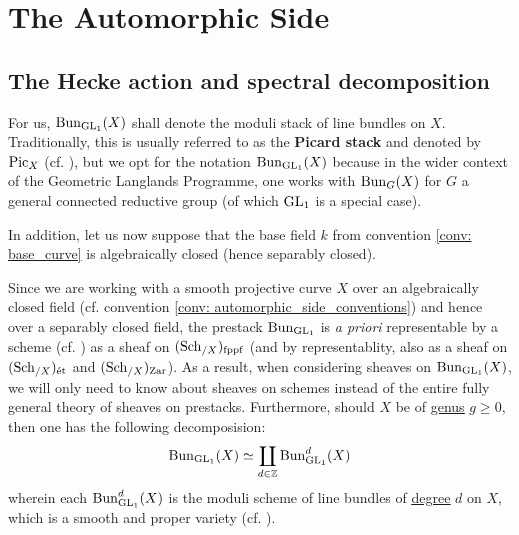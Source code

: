 \section{The Automorphic Side}
    \subsection{The Hecke action and spectral decomposition}
        \begin{convention} \label{conv: automorphic_side_conventions}
            For us, $\mathrm{Bun}_{\operatorname{GL}_1}(X)$ shall denote the moduli stack of line bundles on $X$. Traditionally, this is usually referred to as the \textbf{Picard stack} and denoted by $\mathrm{Pic}_X$ (cf. \cite[\href{https://stacks.math.columbia.edu/tag/0372}{Tag 0372}]{stacks}), but we opt for the notation $\mathrm{Bun}_{\operatorname{GL}_1}(X)$ because in the wider context of the Geometric Langlands Programme, one works with $\mathrm{Bun}_G(X)$ for $G$ a general connected reductive group (of which $\operatorname{GL}_1$ is a special case). 
            
            In addition, let us now suppose that the base field $k$ from convention \ref{conv: base_curve} is algebraically closed (hence separably closed).
        \end{convention}
        \begin{remark} \label{remark: geometry_of_the_picard_stack}
            Since we are working with a smooth projective curve $X$ over an algebraically closed field (cf. convention \ref{conv: automorphic_side_conventions}) and hence over a separably closed field, the prestack $\mathrm{Bun}_{\operatorname{GL}_1}$ is \textit{a priori} representable by a scheme (cf. \cite[\href{https://stacks.math.columbia.edu/tag/0B9Z}{Tag 0B9Z}]{stacks}) as a sheaf on $(\mathrm{Sch}_{/X})_{\mathrm{fppf}}$ (and by representablity, also as a sheaf on $(\mathrm{Sch}_{/X})_{\mathrm{\acute{e}t}}$ and $(\mathrm{Sch}_{/X})_{\mathrm{Zar}}$). As a result, when considering sheaves on $\mathrm{Bun}_{\operatorname{GL}_1}(X)$, we will only need to know about sheaves on schemes instead of the entire fully general theory of sheaves on prestacks. Furthermore, should $X$ be of \href{https://stacks.math.columbia.edu/tag/0BY6}{\underline{genus}} $g \geq 0$, then one has the following decomposision:
                $$\mathrm{Bun}_{\operatorname{GL}_1}(X) \simeq \coprod_{d \in \mathbb{Z}} \mathrm{Bun}_{\operatorname{GL}_1}^d(X)$$
            wherein each $\mathrm{Bun}_{\operatorname{GL}_1}^d(X)$ is the moduli scheme of line bundles of \href{https://stacks.math.columbia.edu/tag/0AYQ}{\underline{degree}} $d$ on $X$, which is a smooth and proper variety (cf. \cite[\href{https://stacks.math.columbia.edu/tag/0BA0}{Tag 0BA0}]{stacks}).
        \end{remark}
        

